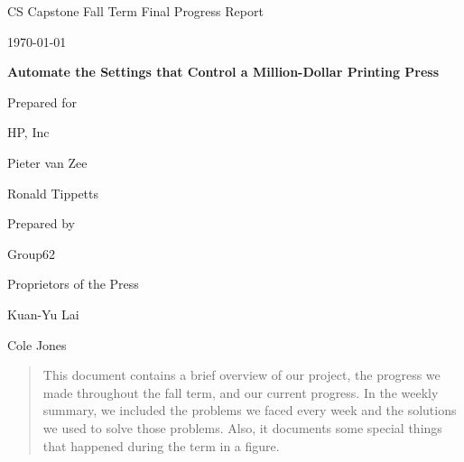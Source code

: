 \documentclass[onecolumn, draftclsnofoot,10pt, compsoc]{IEEEtran}
\def \CapstoneTeamName{Proprietors of the Press}
\def \CapstoneTeamNumber{62}
\def \GroupMemberOne{Kuan-Yu Lai}
\def \GroupMemberTwo{Cole Jones}
\def \CapstoneProjectName{Automate the Settings that Control a Million-Dollar Printing Press}
\def \CapstoneSponsorCompany{HP, Inc}
\def \CapstoneSponsorPersonA{Pieter van Zee}
\def \CapstoneSponsorPersonB{Ronald Tippetts}
\def \DocType{Fall Term Final Progress Report}
\newcommand{\NameSigPair}[1]{\par
\makebox[2.75in][r]{#1} \hfil 	\makebox[3.25in]{\makebox[2.25in]{\hrulefill} \hfill		\makebox[.75in]{\hrulefill}}
\par\vspace{-12pt} \textit{\tiny\noindent
\makebox[2.75in]{} \hfil		\makebox[3.25in]{\makebox[2.25in][r]{Signature} \hfill	\makebox[.75in][r]{Date}}}}
\renewcommand{\NameSigPair}[1]{#1}
\begin{document}
\begin{titlepage}
    \begin{singlespace}
        \hfill 
        \par\vspace{.2in}
        \centering
        \scshape{
            \huge CS Capstone \DocType \par
            {\large\AdvanceDate[-1]\today}\par
            \vspace{1.0in}
            \textbf{\Huge\CapstoneProjectName}\par
            \vfill
            {\large Prepared for}\par
            \Huge \CapstoneSponsorCompany\par
            \vspace{5pt}
            {\Large\NameSigPair{\CapstoneSponsorPersonA}\par}
            {\Large\NameSigPair{\CapstoneSponsorPersonB}\par}
            {\large Prepared by }\par
            Group\CapstoneTeamNumber\par
            \CapstoneTeamName\par 
            \vspace{5pt}
            {\Large
                \NameSigPair{\GroupMemberOne}\par
                \NameSigPair{\GroupMemberTwo}\par
            }
            \vspace{20pt}
        }
        \vspace{72pt}
        \begin{abstract}
        	This document contains a brief overview of our project, the progress we made throughout the fall term, and our current progress. In the weekly summary, we included the problems we faced every week and the solutions we used to solve those problems. Also, it documents some special things that happened during the term in a figure.
        \end{abstract}
    \end{singlespace}
\end{titlepage}
\newpage
{}
\tableofcontents
\clearpage
\end{document}
